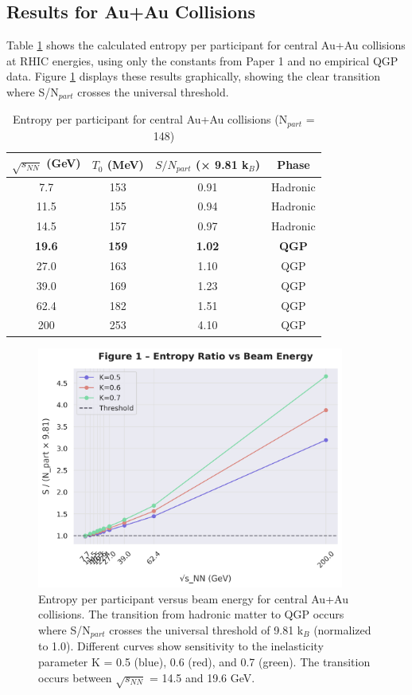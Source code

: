 \documentclass[12pt,a4paper]{article}
\begin{document}
\subsection{Results for Au+Au Collisions}

Table \ref{tab:results} shows the calculated entropy per participant for central Au+Au collisions at RHIC energies, using only the constants from Paper 1 and no empirical QGP data. Figure \ref{fig:entropy_ratio} displays these results graphically, showing the clear transition where S/N$_{part}$ crosses the universal threshold.

\begin{table}[H]
\centering
\caption{Entropy per participant for central Au+Au collisions (N$_{part}$ = 148)}
\label{tab:results}
\begin{tabular}{|c|c|c|c|}
\hline
$\sqrt{s_{NN}}$ (GeV) & $T_0$ (MeV) & $S/N_{part}$ (× 9.81 k$_B$) & Phase \\
\hline
7.7   & 153 & 0.91 & Hadronic \\
11.5  & 155 & 0.94 & Hadronic \\
14.5  & 157 & 0.97 & Hadronic \\
\textbf{19.6}  & \textbf{159} & \textbf{1.02} & \textbf{QGP} \\
27.0  & 163 & 1.10 & QGP \\
39.0  & 169 & 1.23 & QGP \\
62.4  & 182 & 1.51 & QGP \\
200   & 253 & 4.10 & QGP \\
\hline
\end{tabular}
\end{table}

\begin{figure}[H]
\centering
\includegraphics[width=0.9\textwidth]{figures/figure1_entropy_ratio.png}
\caption{Entropy per participant versus beam energy for central Au+Au collisions. The transition from hadronic matter to QGP occurs where S/N$_{part}$ crosses the universal threshold of 9.81 k$_B$ (normalized to 1.0). Different curves show sensitivity to the inelasticity parameter K = 0.5 (blue), 0.6 (red), and 0.7 (green). The transition occurs between $\sqrt{s_{NN}}$ = 14.5 and 19.6 GeV.}
\label{fig:entropy_ratio}
\end{figure}
\end{document}
